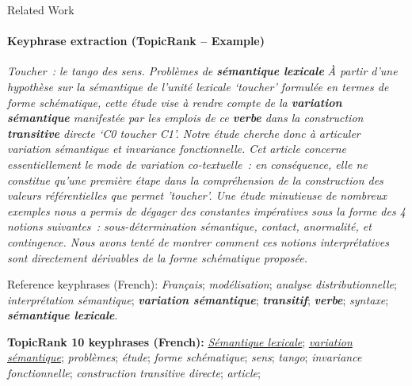 \begin{frame}{Related Work}\framesubtitle{Keyphrase extraction (TopicRank -- Example)}
  \vfill{}
  \begin{exampleblock}{\normalsize
    \textit{Toucher~: le tango des sens. Problèmes de \textbf{sémantique lexicale}}
  }\justifying\footnotesize
    \textit{À partir d'une hypothèse sur la sémantique de l'unité lexicale `toucher' formulée en termes de forme schématique, cette étude vise à rendre compte de la \textbf{variation sémantique} manifestée par les emplois de ce \textbf{verbe} dans la construction \textbf{transitive} directe `C0 toucher C1'. Notre étude cherche donc à articuler variation sémantique et invariance fonctionnelle. Cet article concerne essentiellement le mode de variation co-textuelle~: en conséquence, elle ne constitue qu'une première étape dans la compréhension de la construction des valeurs référentielles que permet 'toucher'. Une étude minutieuse de nombreux exemples nous a permis de dégager des constantes impératives sous la forme des 4 notions suivantes~: sous-détermination sémantique, contact, anormalité, et contingence. Nous avons tenté de montrer comment ces notions interprétatives sont directement dérivables de la forme schématique proposée.}
  
    \begin{exampleblock}{\normalsize Reference keyphrases (French):}
      \textit{Français}; \textit{modélisation}; \textit{analyse distributionnelle}; \textit{interprétation sémantique}; \textbf{\textit{variation sémantique}}; \textbf{\textit{transitif}}; \textbf{\textit{verbe}}; \textit{syntaxe}; \textbf{\textit{sémantique lexicale}}.
    \end{exampleblock}
    
    \vspace{-.75em}
    
    \begin{exampleblock}{\normalsize \textbf{TopicRank 10 keyphrases (French):}}
      \underline{\textit{Sémantique lexicale}};
      \underline{\textit{variation sémantique}};
      \textit{problèmes};
      \textit{étude};
      \textit{forme schématique};
      \textit{sens};
      \textit{tango};
      \textit{invariance fonctionnelle};
      \textit{construction transitive directe};
      \textit{article};
    \end{exampleblock}
  \end{exampleblock}
  \vfill{}
\end{frame}

